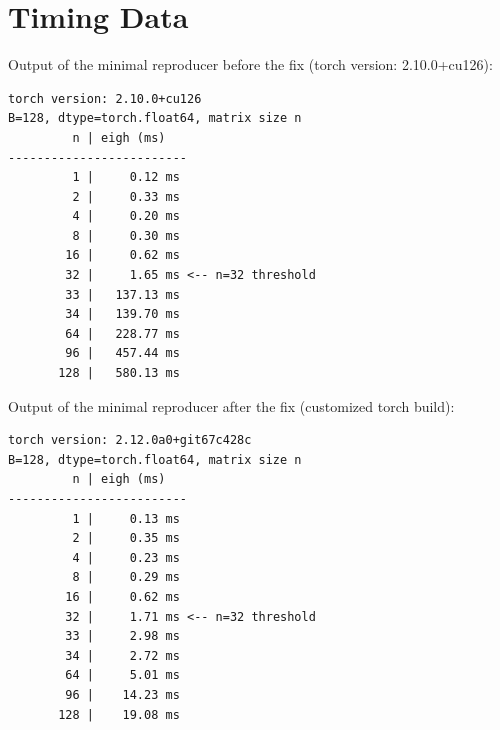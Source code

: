 \documentclass[10pt, letterpaper]{article}
\begin{document}
\section{Timing Data}
Output of the minimal reproducer before the fix (torch version: 2.10.0+cu126):
\begin{lstlisting}[style=python]
torch version: 2.10.0+cu126
B=128, dtype=torch.float64, matrix size n
         n | eigh (ms) 
-------------------------
         1 |     0.12 ms
         2 |     0.33 ms
         4 |     0.20 ms
         8 |     0.30 ms
        16 |     0.62 ms
        32 |     1.65 ms <-- n=32 threshold
        33 |   137.13 ms
        34 |   139.70 ms
        64 |   228.77 ms
        96 |   457.44 ms
       128 |   580.13 ms
\end{lstlisting}
Output of the minimal reproducer after the fix (customized torch build):
\begin{lstlisting}[style=python]
torch version: 2.12.0a0+git67c428c
B=128, dtype=torch.float64, matrix size n
         n | eigh (ms) 
-------------------------
         1 |     0.13 ms
         2 |     0.35 ms
         4 |     0.23 ms
         8 |     0.29 ms
        16 |     0.62 ms
        32 |     1.71 ms <-- n=32 threshold
        33 |     2.98 ms
        34 |     2.72 ms
        64 |     5.01 ms
        96 |    14.23 ms
       128 |    19.08 ms
\end{lstlisting}
\end{document}
